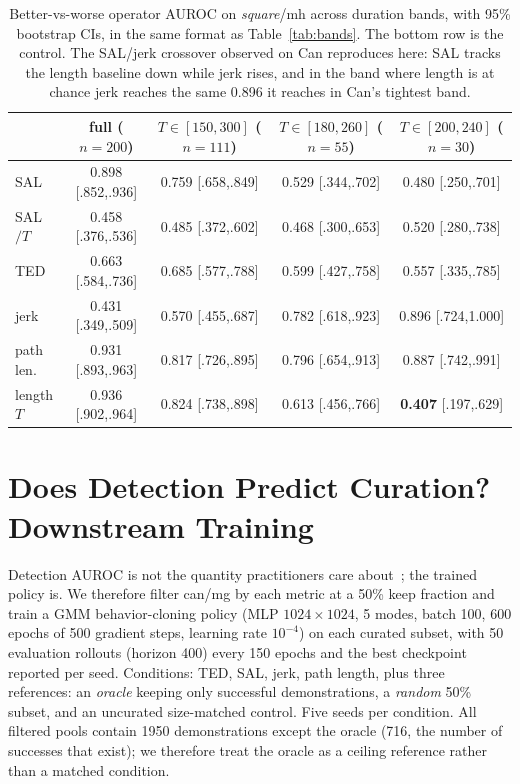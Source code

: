 \documentclass{article}
\begin{document}
\begin{table}[t]
\centering
\small
\begin{tabular}{lcccc}
\toprule
& full ($n{=}200$) & $T \in [150,300]$ ($n{=}111$) & $T \in [180,260]$ ($n{=}55$) & $T \in [200,240]$ ($n{=}30$) \\
\midrule
SAL       & 0.898 [.852,.936] & 0.759 [.658,.849] & 0.529 [.344,.702] & 0.480 [.250,.701] \\
SAL$/T$   & 0.458 [.376,.536] & 0.485 [.372,.602] & 0.468 [.300,.653] & 0.520 [.280,.738] \\
TED       & 0.663 [.584,.736] & 0.685 [.577,.788] & 0.599 [.427,.758] & 0.557 [.335,.785] \\
jerk      & 0.431 [.349,.509] & 0.570 [.455,.687] & 0.782 [.618,.923] & 0.896 [.724,1.000] \\
path len. & 0.931 [.893,.963] & 0.817 [.726,.895] & 0.796 [.654,.913] & 0.887 [.742,.991] \\
\midrule
length $T$ & 0.936 [.902,.964] & 0.824 [.738,.898] & 0.613 [.456,.766] & \textbf{0.407} [.197,.629] \\
\bottomrule
\end{tabular}
\caption{Better-vs-worse operator AUROC on \emph{square}/mh across duration
bands, with 95\% bootstrap CIs, in the same format as
Table~\ref{tab:bands}. The bottom row is the control. The SAL/jerk
crossover observed on Can reproduces here: SAL tracks the length baseline
down while jerk rises, and in the band where length is at chance jerk
reaches the same 0.896 it reaches in Can's tightest band.}
\label{tab:square}
\end{table}

\section{Does Detection Predict Curation? Downstream Training}
\label{sec:training}

Detection AUROC is not the quantity practitioners care
about~\citep{bedi-policy}; the trained policy is. We therefore filter can/mg
by each metric at a 50\% keep fraction and train a GMM behavior-cloning
policy (MLP $1024{\times}1024$, 5 modes, batch 100, 600 epochs of 500
gradient steps, learning rate $10^{-4}$) on each curated subset, with 50
evaluation rollouts (horizon 400) every 150 epochs and the best checkpoint
reported per seed. Conditions: TED, SAL, jerk, path length, plus three
references: an \emph{oracle} keeping only successful demonstrations, a
\emph{random} 50\% subset, and an uncurated size-matched control. Five seeds
per condition. All filtered pools contain 1950 demonstrations except the
oracle (716, the number of successes that exist); we therefore treat the
oracle as a ceiling reference rather than a matched condition.
\end{document}
